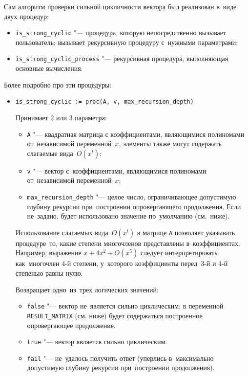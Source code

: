 Сам алгоритм проверки сильной цикличности вектора был реализован в~виде двух процедур:
\begin{itemize}
    \item
        \verb|is_strong_cyclic| "--- процедура, которую непосредственно вызывает пользователь;
        вызывает рекурсивную процедуру с~нужными параметрами;
    \item
        \verb|is_strong_cyclic_process| "--- рекурсивная процедура, выполняющая основные вычисления.
\end{itemize}

Более подробно про эти процедуры:
\begin{itemize}
    \item
        \verb|is_strong_cyclic := proc(A, v, max_recursion_depth)|

        Принимает 2 или 3 параметра:
        \begin{itemize}
            \item
                \verb|A| "--- квадратная матрица с коэффициентами, являющимися полиномами от~независимой переменной~$x$,
                элементы также могут содержать слагаемые вида~$O(x^t)$;
            \item
                \verb|v| "--- вектор с~коэффициентами, являющимися полиномами от~независимой переменной~$x$;
             \item
                \verb|max_recursion_depth| "--- целое число,
                ограничивающее допустимую глубину рекурсии при~построении опровергающего продолжения.
                Если не~задано, будет использовано значение по~умолчанию (см.~ниже).
        \end{itemize}

        Использование слагаемых вида~$O(x^t)$ в матрице \verb|A| позволяет указывать процедуре~то, какие степени многочленов
        представлены в~коэффициентах.
        Например, выражение $x + 4x^2 + O(x^5)$ следует интерпретировать как~многочлен 4-й степени,
        у~которого коэффициенты перед~3-й и 4-й степенью равны нулю.

        \newpage
        Возвращает одно~из~трех логических значений:
        \begin{itemize}
            \item
                \verb|false| "--- вектор не~является сильно циклическим;
                в переменной \verb|RESULT_MATRIX| (см. ниже) будет содержаться построенное опровергающее продолжение.
            \item
                \verb|true| "--- вектор является сильно циклическим.
             \item
                \verb|fail| "--- не~удалось получить ответ (уперлись в~максимально допустимую глубину рекурсии
                при~построении продолжения).
        \end{itemize}


\end{itemize}
